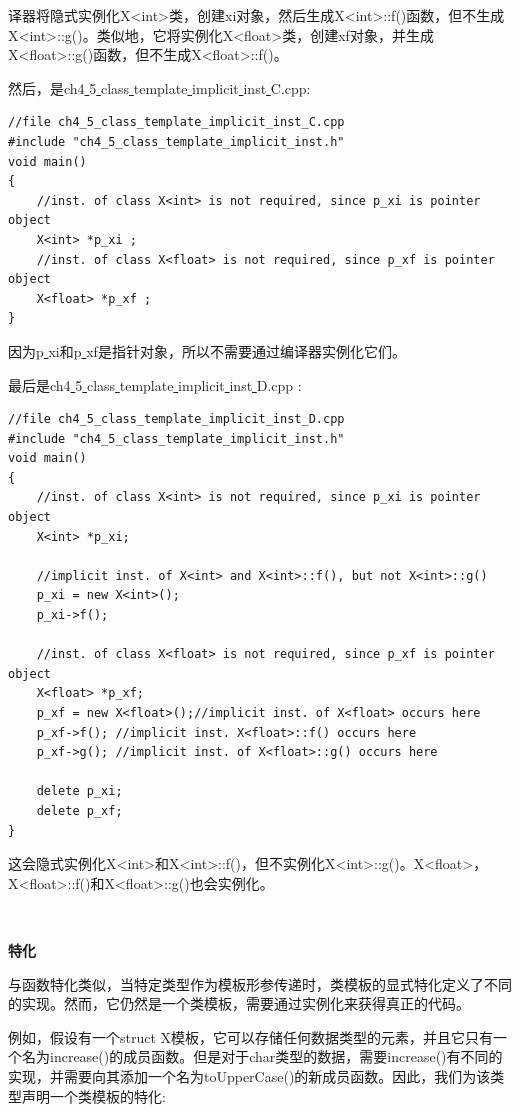 译器将隐式实例化X<int>类，创建xi对象，然后生成X<int>::f()函数，但不生成X<int>::g()。类似地，它将实例化X<float>类，创建xf对象，并生成X<float>::g()函数，但不生成X<float>::f()。 \par
然后，是ch4\underline{ }5\underline{ }class\underline{ }template\underline{ }implicit\underline{ }inst\underline{ }C.cpp: \par

\begin{lstlisting}[caption={}]
//file ch4_5_class_template_implicit_inst_C.cpp
#include "ch4_5_class_template_implicit_inst.h"
void main()
{
	//inst. of class X<int> is not required, since p_xi is pointer object
	X<int> *p_xi ;
	//inst. of class X<float> is not required, since p_xf is pointer object
	X<float> *p_xf ;
}
\end{lstlisting}

因为p\underline{ }xi和p\underline{ }xf是指针对象，所以不需要通过编译器实例化它们。 \par
最后是ch4\underline{ }5\underline{ }class\underline{ }template\underline{ }implicit\underline{ }inst\underline{ }D.cpp : \par

\begin{lstlisting}[caption={}]
//file ch4_5_class_template_implicit_inst_D.cpp
#include "ch4_5_class_template_implicit_inst.h"
void main()
{
	//inst. of class X<int> is not required, since p_xi is pointer object
	X<int> *p_xi;
	
	//implicit inst. of X<int> and X<int>::f(), but not X<int>::g()
	p_xi = new X<int>();
	p_xi->f();
	
	//inst. of class X<float> is not required, since p_xf is pointer object
	X<float> *p_xf;
	p_xf = new X<float>();//implicit inst. of X<float> occurs here
	p_xf->f(); //implicit inst. X<float>::f() occurs here
	p_xf->g(); //implicit inst. of X<float>::g() occurs here
	
	delete p_xi;
	delete p_xf;
}
\end{lstlisting}

这会隐式实例化X<int>和X<int>::f()，但不实例化X<int>::g()。X<float>，X<float>::f()和X<float>::g()也会实例化。 \par

\noindent\textbf{}\ \par
\textbf{特化} \ \par
与函数特化类似，当特定类型作为模板形参传递时，类模板的显式特化定义了不同的实现。然而，它仍然是一个类模板，需要通过实例化来获得真正的代码。\par
例如，假设有一个struct X模板，它可以存储任何数据类型的元素，并且它只有一个名为increase()的成员函数。但是对于char类型的数据，需要increase()有不同的实现，并需要向其添加一个名为toUpperCase()的新成员函数。因此，我们为该类型声明一个类模板的特化: \par

